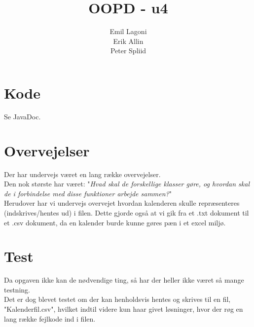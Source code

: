 \documentclass[a4paper,11pt]{article}
\title{\textbf{OOPD - u4}}
\author{Emil Lagoni\\Erik Allin\\Peter Spliid}
\begin{document}
\maketitle
\section*{Kode}
Se JavaDoc.


\section*{Overvejelser}
Der har undervejs været en lang række overvejelser. \\
Den nok største har været: "\textit{Hvad skal de forskellige klasser gøre, og hvordan skal de i forbindelse med disse funktioner arbejde sammen?}" \\
Herudover har vi undervejs overvejet hvordan kalenderen skulle repræsenteres (indskrives/hentes ud) i filen. Dette gjorde også at vi gik fra et .txt dokument til et .csv dokument, da en kalender burde kunne gøres pæn i et excel miljø.

\section*{Test}
Da opgaven ikke kan de nødvendige ting, så har der heller ikke været så mange testning. \\
Det er dog blevet testet om der kan henholdsvis hentes og skrives til en fil, "Kalenderfil.csv", hvilket indtil videre kun haar givet løsninger, hvor der røg en lang række fejlkode ind i filen.
\end{document}
